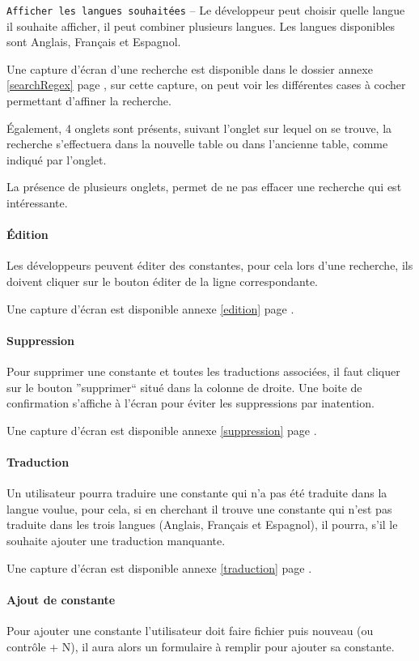             \texttt{Afficher les langues souhaitées} -- Le développeur peut choisir quelle langue il souhaite afficher, il peut combiner plusieurs langues. Les langues disponibles sont Anglais, Français et Espagnol.

            Une capture d'écran d'une recherche est disponible dans le dossier annexe \ref{searchRegex} page \pageref{searchRegex}, sur cette capture, on peut voir les différentes cases à cocher permettant d'affiner la recherche.

            \'Egalement, 4 onglets sont présents, suivant l'onglet sur lequel on se trouve, la recherche s'effectuera dans la nouvelle table ou dans l'ancienne table, comme indiqué par l'onglet.

            La présence de plusieurs onglets, permet de ne pas effacer une recherche qui est intéressante.

        \paragraph{\'Edition}
        Les développeurs peuvent éditer des constantes, pour cela lors d'une recherche, ils doivent cliquer sur le bouton éditer de la ligne correspondante.

        Une capture d'écran est disponible annexe \ref{edition} page \pageref{edition}.
        \paragraph{Suppression}
            Pour supprimer une constante et toutes les traductions associées, il faut cliquer sur le bouton ''supprimer`` situé dans la colonne de droite. Une boite de confirmation s'affiche à l'écran pour éviter les suppressions par inatention.

        Une capture d'écran est disponible annexe \ref{suppression} page \pageref{suppression}.
        \paragraph{Traduction}
            Un utilisateur pourra traduire une constante qui n'a pas été traduite dans la langue voulue, pour cela, si en cherchant il trouve une constante qui n'est pas traduite dans les trois langues (Anglais, Français et Espagnol), il pourra, s'il le souhaite ajouter une traduction manquante.

        Une capture d'écran est disponible annexe \ref{traduction} page \pageref{traduction}.
        \paragraph{Ajout de constante}
            Pour ajouter une constante l'utilisateur doit faire fichier puis nouveau (ou contrôle + N), il aura alors un formulaire à remplir pour ajouter sa constante.

